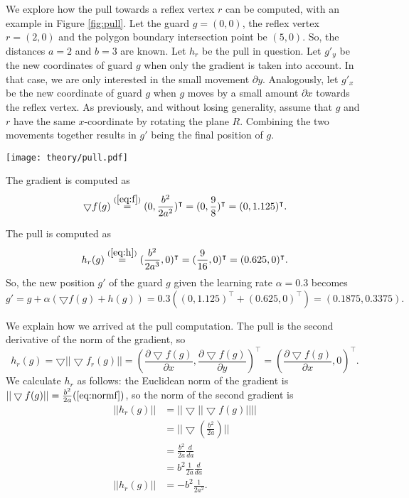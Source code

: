 We explore how the pull towards a reflex vertex $r$ can be computed, with an example in Figure \ref{fig:pull}. Let the guard $g = (0, 0)$, the reflex vertex $r = (2, 0)$ and the polygon boundary intersection point be $(5, 0)$. So, the distances $a = 2$ and $b = 3$ are known. Let $h_r$ be the pull in question. Let $g'_y$ be the new coordinates of guard $g$ when only the gradient is taken into account. In that case, we are only interested in the small movement $\partial y$. Analogously, let $g'_x$ be the new coordinate of guard $g$ when $g$ moves by a small amount $\partial x$ towards the reflex vertex. As previously, and without losing generality, assume that $g$ and $r$ have the same $x$-coordinate by rotating the plane $R$. Combining the two movements together results in $g'$ being the final position of $g$.

\begin{figure*}[!h]
    \texttt{[image: theory/pull.pdf]}
    \centering
    \caption{Computing the movements of the guard $g$ based on both the gradient and the pull towards reflex vertex $r$. The new position of the guard with learning rate $\alpha = 0.3$ becomes $g' = (0.1875, 0.3375)$.}
    \label{fig:pull}
\end{figure*}

The gradient is computed as
$$\bigtriangledown f(g) \overset{(\ref{eq:f})}{=} (0, \frac{b^2}{2a^2})^\intercal = (0, \frac{9}{8})^\intercal = (0, 1.125)^\intercal.$$ 

The pull is computed as 
$$h_r(g) \overset{(\ref{eq:h})}{=} (\frac{b^2}{2a^3}, 0)^\intercal = (\frac{9}{16}, 0)^\intercal = (0.625, 0)^\intercal.$$
So, the new position $g'$ of the guard $g$ given the learning rate $\alpha = 0.3$ becomes 
$$g' = g + \alpha(\bigtriangledown f(g) + h(g)) = 0.3 ((0, 1.125)^\intercal + (0.625, 0)^\intercal) = (0.1875, 0.3375).$$

We explain how we arrived at the pull computation. The pull is the second derivative of the norm of the gradient, so 
$$h_r(g) = \bigtriangledown ||\bigtriangledown f_r(g)|| = \left(\frac{\partial \bigtriangledown f(g)}{\partial x}, \frac{\partial \bigtriangledown f(g)}{\partial y}\right)^\intercal = \left(\frac{\partial \bigtriangledown f(g)}{\partial x}, 0\right)^\intercal.$$  
We calculate $h_r$ as follows: the Euclidean norm of the gradient is $||\bigtriangledown f(g)|| = \frac{b^2}{2a} (\ref{eq:normf})$, so the norm of the second gradient is 
\begin{align*}
||h_r(g)||&= ||\bigtriangledown ||\bigtriangledown f(g)|||| \\
       &= ||\bigtriangledown (\frac{b^2}{2a})|| \\
       &= \frac{b^2}{2a}\frac{d}{da} \\
       &= b^2\frac{1}{2a}\frac{d}{da} \\
||h_r(g)||&= -b^2\frac{1}{2a^2}.
\end{align*}

